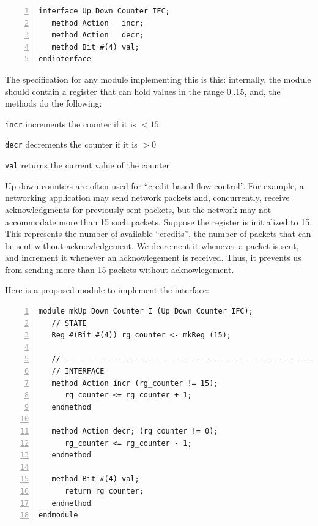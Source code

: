 {\footnotesize
\begin{Verbatim}[frame=single, numbers=left]
interface Up_Down_Counter_IFC;
   method Action   incr;
   method Action   decr;
   method Bit #(4) val;
endinterface
\end{Verbatim}
}

The specification for any module implementing this is this:
internally, the module should contain a register that can hold values
in the range 0..15, and, the methods do the following:

\begin{tightlist}
 \item \verb|incr|  increments the counter if it is $< 15$
 \item \verb|decr|  decrements the counter if it is $> 0$
 \item \verb|val|   returns the current value of the counter
\end{tightlist}

Up-down counters are often used for ``credit-based flow control''.
For example, a networking application may send network packets and,
concurrently, receive acknowledgments for previously sent packets, but
the network may not accommodate more than 15 such packets.  Suppose
the register is initialized to 15.  This represents the number of
available ``credits'', {\ie} the number of packets that can be sent
without acknowledgement.  We decrement it whenever a packet is sent,
and increment it whenever an acknowlegement is received.  Thus, it
prevents us from sending more than 15 packets without acknowlegement.

Here is a proposed module to implement the interface:

{\footnotesize
\begin{Verbatim}[frame=single, numbers=left]
module mkUp_Down_Counter_I (Up_Down_Counter_IFC);
   // STATE
   Reg #(Bit #(4)) rg_counter <- mkReg (15);

   // ----------------------------------------------------------------
   // INTERFACE
   method Action incr (rg_counter != 15);
      rg_counter <= rg_counter + 1;
   endmethod

   method Action decr; (rg_counter != 0);
      rg_counter <= rg_counter - 1;
   endmethod

   method Bit #(4) val;
      return rg_counter;
   endmethod
endmodule
\end{Verbatim}
}


